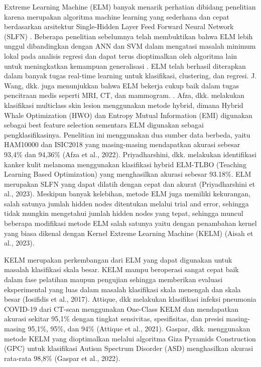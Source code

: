    Extreme Learning Machine (ELM) banyak menarik perhatian dibidang penelitian karena merupakan algoritma machine learning yang sederhana dan cepat berdasarkan arsitektur Single-Hidden Layer Feed Forward Neural Network (SLFN) \autocite{Li2022}. Beberapa penelitian sebelumnya telah membuktikan bahwa ELM lebih unggul dibandingkan dengan ANN dan SVM dalam mengatasi masalah minimum lokal pada analisis regresi dan dapat terus dioptimalkan oleh algoritma lain untuk meningkatkan kemampuan generalisasi \autocite{Kardani2022,Yaseen2018}. ELM telah berhasil diterapkan dalam banyak tugas real-time learning untuk klasifikasi, clustering, dan regresi. J. Wang, dkk. juga menunjukkan bahwa ELM bekerja cukup baik dalam tugas pencitraan medis seperti MRI, CT, dan mammogram. \autocite{Wang2022}. Afza, dkk. melakukan klasifikasi multiclass skin lesion menggunakan metode hybrid, dimana Hybrid Whale Optimization (HWO) dan Entropy Mutual Information (EMI) digunakan sebagai best feature selection sementara ELM digunakan sebagai pengklasifikasinya. Penelitian ini menggunakan dua sumber data berbeda, yaitu HAM10000 dan ISIC2018 yang masing-masing mendapatkan akurasi sebesar 93,4\% dan 94,36\% (Afza et al., 2022). Priyadharshini, dkk. melakukan identifikasi kanker kulit melanoma menggunakan klasifikasi hybrid ELM-TLBO (Teaching Learning Based Optimization) yang menghasilkan akurasi sebesar 93.18\%. ELM merupakan SLFN yang dapat dilatih dengan cepat dan akurat (Priyadharshini et al., 2023). Meskipun banyak kelebihan, metode ELM juga memiliki kekurangan, salah satunya jumlah hidden nodes ditentukan melalui trial and error, sehingga tidak mungkin mengetahui jumlah hidden nodes yang tepat, sehingga muncul beberapa modifikasi metode ELM salah satunya yaitu dengan penambahan kernel yang biasa dikenal dengan Kernel Extreme Learning Machine (KELM) (Aisah et al., 2023).

    KELM merupakan perkembangan dari ELM yang dapat digunakan untuk masalah klasifikasi skala besar. KELM mampu beroperasi sangat cepat baik dalam fase pelatihan maupun pengujian sehingga memberikan evaluasi eksperimental yang luas dalam masalah klasifikasi skala menengah dan skala besar (Iosifidis et al., 2017). Attique, dkk melakukan klasifikasi infeksi pneumonia COVID-19 dari CT-scan menggunakan One-Class KELM dan mendapatkan akurasi sekitar 95,1\% dengan tingkat sensivitas, spesifisitas, dan presisi masing-masing 95,1\%, 95\%, dan 94\% (Attique et al., 2021). Gaspar, dkk. menggunakan metode KELM yang dioptimalkan melalui algoritma Giza Pyramids Construction (GPC) untuk klasifikasi Autism Spectrum Disorder (ASD) menghasilkan akurasi rata-rata 98,8\% (Gaspar et al., 2022).


